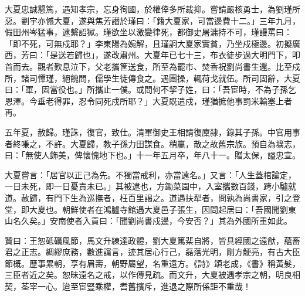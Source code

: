 \begin{pinyinscope}
大夏忠誠懇篤，遇知孝宗，忘身徇國，於權倖多所裁抑。嘗請嚴核勇士，為劉瑾所惡。劉宇亦憾大夏，遂與焦芳譖於瑾曰：「籍大夏家，可當邊費十二。」三年九月，假田州岑猛事，逮繫詔獄。瑾欲坐以激變律死，都御史屠滽持不可，瑾謾罵曰：「即不死，可無戍耶？」李東陽為婉解，且瑾詗大夏家實貧，乃坐戍極邊。初擬廣西，芳曰：「是送若歸也」，遂改肅州。大夏年已七十三，布衣徒步過大明門下，叩首而去。觀者歎息泣下，父老攜筐送食，所至為罷市、焚香祝劉尚書生還。比至戍所，諸司憚瑾，絕餽問，儒學生徒傳食之。遇團操，輒荷戈就伍。所司固辭，大夏曰：「軍，固當役也。」所攜止一僕。或問何不挈子姓，曰：「吾宦時，不為子孫乞恩澤。今垂老得罪，忍令同死戍所耶？」大夏既遣戍，瑾猶摭他事罰米輸塞上者再。

五年夏，赦歸。瑾誅，復官，致仕。清軍御史王相請復廩隸，錄其子孫。中官用事者終嗛之，不許。大夏歸，教子孫力田謀食。稍贏，散之故舊宗族。預自為壙志，曰：「無使人飾美，俾懷愧地下也。」十一年五月卒，年八十一。贈太保，謚忠宣。

大夏嘗言：「居官以正己為先。不獨當戒利，亦當遠名。」又言：「人生蓋棺論定，一日未死，即一日憂責未已。」其被逮也，方鋤菜園中，入室攜數百錢，跨小驢就道。赦歸，有門下生為巡撫者，枉百里謁之。道遇扶犁者，問孰為尚書家，引之登堂，即大夏也。朝鮮使者在鴻臚寺館遇大夏邑子張生，因問起居曰：「吾國聞劉東山名久矣。」安南使者入貢曰：「聞劉尚書戍邊，今安否？」其為外國所重如此。

贊曰：王恕砥礪風節，馬文升練達政體，劉大夏篤棐自將，皆具經國之遠猷，蘊畜君之正志。綢繆庶務，數進讜言，迹其居心行己，磊落光明，剛方鯁亮，有古大臣節概。歷事累朝，享有眉壽，朝野屬望，名重遠方。《詩》頌老成，《書》稱黃髮，三臣者近之矣。恕昧遠名之戒，以作傳見疏。而文升，大夏被遇孝宗之朝，明良相契，荃宰一心。迨至宦豎乘權，耆舊擯斥，進退之際所係詎不重哉！


\end{pinyinscope}
